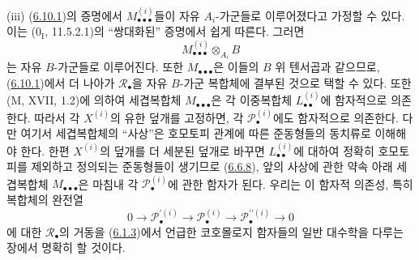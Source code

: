 \begin{remarks}[6.10.3]
\medskip
{}
\textnormal{(iii)} (\hyperref[III.6.10.1-fr]{6.10.1})의 증명에서
$M_{\bullet\bullet\bullet}^{(i)}$들이 자유 $A_i$-가군들로
이루어졌다고 가정할 수 있다. 이는 ($0_{\mathrm I}$, 11.5.2.1)의
“쌍대화된” 증명에서 쉽게 따른다. 그러면
\[
  M_{\bullet\bullet\bullet}^{(i)}\otimes_{A_i}B
\]
는 자유 $B$-가군들로 이루어진다. 또한
$M_{\bullet\bullet\bullet}$은 이들의 $B$ 위 텐서곱과 같으므로,
(\hyperref[III.6.10.1-fr]{6.10.1})에서 더 나아가
$\mathscr R_\bullet$을 자유 $B$-가군 복합체에 결부된 것으로
택할 수 있다. 또한 (M, XVII, 1.2)에 의하여 세겹복합체
$M_{\bullet\bullet\bullet}$은 각 이중복합체
$L_{\bullet\bullet}^{(i)}$에 함자적으로 의존한다. 따라서 각
$X^{(i)}$의 유한 덮개를 고정하면, 각
$\mathscr P_\bullet^{(i)}$에도 함자적으로 의존한다. 다만 여기서
세겹복합체의 “사상”은 호모토피 관계에 따른 준동형들의 동치류로 이해해야
한다. 한편 $X^{(i)}$의 덮개를 더 세분된 덮개로 바꾸면
$L_{\bullet\bullet}^{(i)}$에 대하여 정확히 호모토피를 제외하고
정의되는 준동형들이 생기므로
(\hyperref[III.6.6.8-fr]{6.6.8}), 앞의 사상에 관한 약속 아래
세겹복합체 $M_{\bullet\bullet\bullet}$은 마침내 각
$\mathscr P_\bullet^{(i)}$에 관한 함자가 된다. 우리는 이 함자적
의존성, 특히 복합체의 완전열
\[
  0\longrightarrow\mathscr P_\bullet^{\prime(i)}
  \longrightarrow\mathscr P_\bullet^{(i)}
  \longrightarrow\mathscr P_\bullet^{\prime\prime(i)}
  \longrightarrow0
\]
에 대한 $\mathscr R_\bullet$의 거동을
(\hyperref[III.6.1.3-fr]{6.1.3})에서 언급한 코호몰로지 함자들의
일반 대수학을 다루는 장에서 명확히 할 것이다.
\end{remarks}

